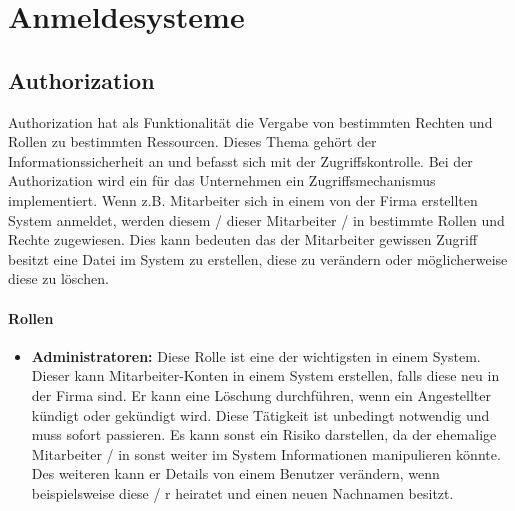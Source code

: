 \chapter{Anmeldesysteme}

\section{Authorization}
Authorization hat als Funktionalität die Vergabe von bestimmten Rechten und Rollen zu bestimmten Ressourcen. Dieses Thema gehört der Informationssicherheit an und befasst sich mit der Zugriffskontrolle. Bei der Authorization wird ein für das Unternehmen ein Zugriffsmechanismus implementiert. Wenn z.B. Mitarbeiter sich in einem von der Firma erstellten System anmeldet, werden diesem / dieser Mitarbeiter / in bestimmte Rollen und Rechte zugewiesen. Dies kann bedeuten das der Mitarbeiter gewissen Zugriff besitzt eine Datei im System zu erstellen, diese zu verändern oder möglicherweise diese zu löschen.

\subsubsection{Rollen}
\begin{itemize}
	\item \textbf{Administratoren:} Diese Rolle ist eine der wichtigsten in einem System. Dieser kann Mitarbeiter-Konten in einem System erstellen, falls diese neu in der Firma sind. Er kann eine Löschung durchführen, wenn ein Angestellter kündigt oder gekündigt wird. Diese Tätigkeit ist unbedingt notwendig und muss sofort passieren. Es kann sonst ein Risiko darstellen, da der ehemalige Mitarbeiter / in sonst weiter im System Informationen manipulieren könnte. Des weiteren kann er Details von einem Benutzer verändern, wenn beispielsweise diese / r heiratet und einen neuen Nachnamen besitzt. 
\end{itemize}